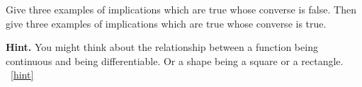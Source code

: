 \documentclass{book}
\begin{document}
\setcounter{project}{13}
\addtocounter{project}{-1}
\begin{activity}[]\label{activity-8}
\hypertarget{p-168}{}%
Give three examples of implications which are true whose converse is false.  Then give three examples of implications which are true whose converse is true.%
\par\smallskip%
\noindent\textbf{Hint.}\hypertarget{hint-1}{}\quad%
\hypertarget{p-169}{}%
You might think about the relationship between a function being continuous and being differentiable.  Or a shape being a square or a rectangle.%
~\hfill{\tiny\hyperlink{a-13}{[hint]}\hypertarget{q-13}{}}\end{activity}
\end{document}
